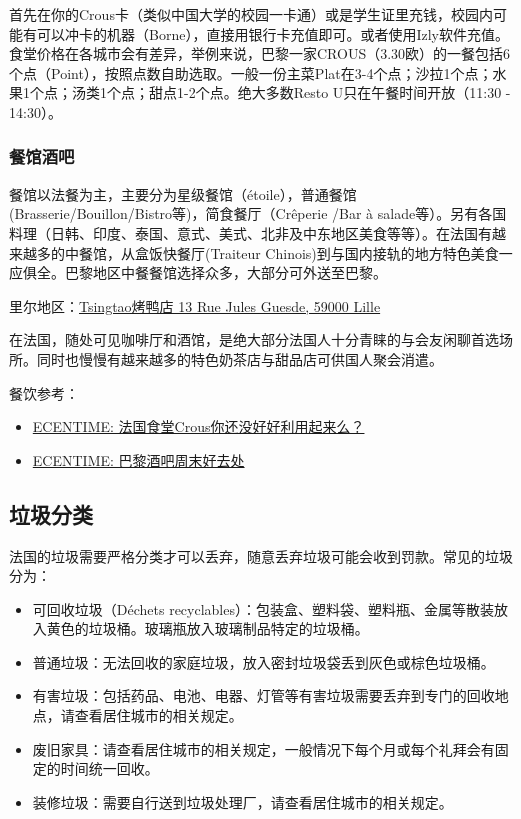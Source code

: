 首先在你的Crous卡（类似中国大学的校园一卡通）或是学生证里充钱，校园内可能有可以冲卡的机器（Borne），直接用银行卡充值即可。或者使用Izly软件充值。食堂价格在各城市会有差异，举例来说，巴黎一家CROUS（3.30欧）的一餐包括6个点（Point），按照点数自助选取。一般一份主菜Plat在3-4个点；沙拉1个点；水果1个点；汤类1个点；甜点1-2个点。绝大多数Resto U只在午餐时间开放（11:30 - 14:30）。

\subsubsection{餐馆酒吧}
餐馆以法餐为主，主要分为星级餐馆（étoile），普通餐馆(Brasserie/Bouillon/Bistro等)，简食餐厅（Crêperie /Bar à salade等）。另有各国料理（日韩、印度、泰国、意式、美式、北非及中东地区美食等等）。在法国有越来越多的中餐馆，从盒饭快餐厅(Traiteur Chinois)到与国内接轨的地方特色美食一应俱全。巴黎地区中餐餐馆选择众多，大部分可外送至巴黎。

里尔地区：\href{https://maps.app.goo.gl/ScHQq7jbV4Bug9JJ7}{Tsingtao烤鸭店 13 Rue Jules Guesde, 59000 Lille}

在法国，随处可见咖啡厅和酒馆，是绝大部分法国人十分青睐的与会友闲聊首选场所。同时也慢慢有越来越多的特色奶茶店与甜品店可供国人聚会消遣。

餐饮参考：
\begin{itemize}
    \item \href{https://www.ecentime.com/article/comment-profider-le-crous-en-france}{ECENTIME: 法国食堂Crous你还没好好利用起来么？}
    
    \item \href{https://www.ecentime.com/article/ecentime-bar-paris}{ECENTIME: 巴黎酒吧周末好去处}
\end{itemize}

\subsection{垃圾分类}

法国的垃圾需要严格分类才可以丢弃，随意丢弃垃圾可能会收到罚款。常见的垃圾分为：

\begin{itemize}
    \item 可回收垃圾（Déchets recyclables）：包装盒、塑料袋、塑料瓶、金属等散装放入黄色的垃圾桶。玻璃瓶放入玻璃制品特定的垃圾桶。
    \item 普通垃圾：无法回收的家庭垃圾，放入密封垃圾袋丢到灰色或棕色垃圾桶。
    \item 有害垃圾：包括药品、电池、电器、灯管等有害垃圾需要丢弃到专门的回收地点，请查看居住城市的相关规定。
    \item 废旧家具：请查看居住城市的相关规定，一般情况下每个月或每个礼拜会有固定的时间统一回收。
    \item 装修垃圾：需要自行送到垃圾处理厂，请查看居住城市的相关规定。
\end{itemize}

